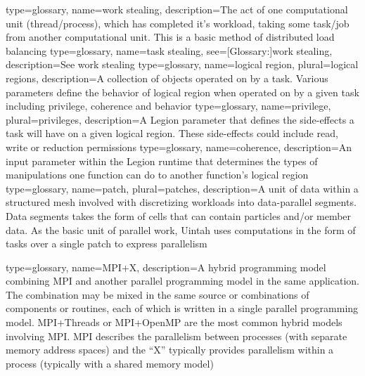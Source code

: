 {
  type={glossary},
  name={work stealing},
  description={The act of one computational unit (thread/process), which has completed it's workload, taking some task/job from another computational unit. This is a basic method of distributed load balancing}
}
{
  type={glossary},
  name={task stealing},
  see={[Glossary:]{work stealing}},
  description={See \gls{work stealing}}
}
{
  type={glossary},
  name={logical region},
  plural={logical regions},
  description={A collection of objects operated on by a task. Various parameters define the behavior of logical region when operated on by a given task including privilege, coherence and behavior}
}
{
  type={glossary},
  name={privilege},
  plural={privileges},
  description={A Legion parameter that defines the side-effects a task will have on a given logical region. These side-effects could include read, write or reduction permissions}
}
{
  type={glossary},
  name={coherence},
  description={An input parameter within the Legion runtime that determines the types of manipulations one function can do to another function's logical region}
}
{
  type={glossary},
  name={patch},
  plural={patches},
  description={A unit of data within a structured mesh involved with discretizing workloads into data-parallel segments. Data segments takes the form of cells that can contain particles and/or member data. As the basic unit of parallel work, Uintah uses computations in the form of tasks over a single patch to express parallelism}
}

{
  type={glossary},
  name={MPI+X},
  description={A hybrid \gls{programming model} combining \gls{MPI} and
  another parallel \gls{programming model} in the same application. The
  combination may be mixed in the same source or combinations of
  components or routines, each of which is written in a single parallel
  \gls{programming model}. \gls{MPI}+Threads or \gls{MPI}+OpenMP are the most
  common hybrid models involving \gls{MPI}. \gls{MPI} describes the
  parallelism between processes (with separate memory address spaces) and
  the ``X'' typically provides parallelism within a process (typically
  with a shared \gls{memory model})}
}

